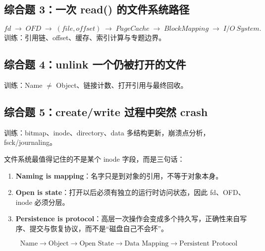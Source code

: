 \documentclass[11pt,a4paper]{ctexart}
\newcommand{\kw}[1]{\textbf{#1}}
\newcommand{\arr}{\;\longrightarrow\;}
\begin{document}
\subsection*{综合题 3：一次 read() 的文件系统路径}
\[
fd\arr OFD\arr(file,offset)\arr PageCache\arr BlockMapping\arr I/O~System.
\]
训练：引用链、offset、缓存、索引计算与专题边界。

\subsection*{综合题 4：unlink 一个仍被打开的文件}
训练：Name $\neq$ Object、链接计数、打开引用与最终回收。

\subsection*{综合题 5：create/write 过程中突然 crash}
训练：bitmap、inode、directory、data 多结构更新，崩溃点分析，fsck/journaling。

\begin{corebox}[三条核心结论]
文件系统最值得记住的不是某个 inode 字段，而是三句话：
\begin{enumerate}
  \item \kw{Naming is mapping}：名字只是到对象的引用，不等于对象本身。
  \item \kw{Open is state}：打开以后必须有独立的运行时访问状态，因此 fd、OFD、inode 必须分层。
  \item \kw{Persistence is protocol}：高层一次操作会变成多个持久写，正确性来自写序、提交与恢复协议，而不是“磁盘自己不会坏”。
\end{enumerate}
\[
\boxed{\text{Name}\to\text{Object}\to\text{Open State}\to\text{Data Mapping}\to\text{Persistent Protocol}}
\]
\end{corebox}
\end{document}
